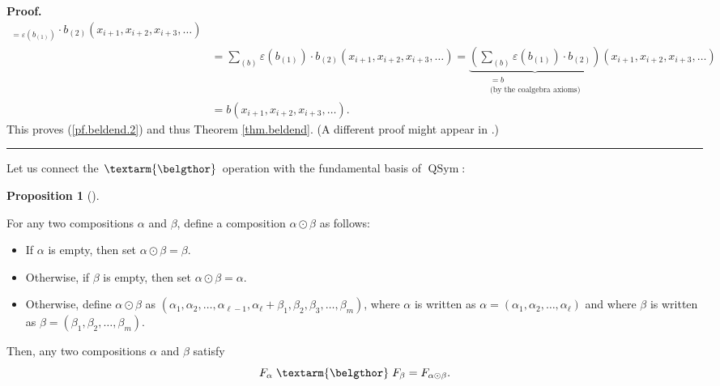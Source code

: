 \documentclass
[numbers=enddot,12pt,final,onecolumn,notitlepage,abstracton]{scrartcl}%
\theoremstyle{definition}
\newtheorem{prop}[theo]{Proposition}
\newenvironment{proposition}[1][]
{\begin{prop}[#1]\begin{leftbar}}
{\end{leftbar}\end{prop}}
\newenvironment{proof}[1][Proof]{\noindent\textbf{#1.} }{\ \rule{0.5em}{0.5em}}
\newenvironment{noncompile}{}{}
\newcommand{\bel}{\left. \textarm{\belgthor} \right.}
\let\sumnonlimits\sum
\renewcommand{\sum}{\sumnonlimits\limits}
\begin{document}
\begin{noncompile}
\begin{proof}
\begin{align*}
{}_{=\varepsilon\left(  b_{\left(  1\right)  }\right)  }\cdot b_{\left(
2\right)  }\left(  x_{i+1},x_{i+2},x_{i+3},\ldots\right) \\
&  =\sum_{\left(  b\right)  }\varepsilon\left(  b_{\left(  1\right)  }\right)
\cdot b_{\left(  2\right)  }\left(  x_{i+1},x_{i+2},x_{i+3},\ldots\right)
=\underbrace{\left(  \sum_{\left(  b\right)  }\varepsilon\left(  b_{\left(
1\right)  }\right)  \cdot b_{\left(  2\right)  }\right)  }%
_{\substack{=b\\\text{(by the coalgebra axioms)}}}\left(  x_{i+1}%
,x_{i+2},x_{i+3},\ldots\right) \\
&  =b\left(  x_{i+1},x_{i+2},x_{i+3},\ldots\right)  .
\end{align*}
This proves (\ref{pf.beldend.2}) and thus Theorem \ref{thm.beldend}. (A
different proof might appear in \cite{Gri-gammapart}.)
\end{proof}
\end{noncompile}

Let us connect the $\bel $ operation with the fundamental basis of
$\operatorname*{QSym}$:

\begin{proposition}
\label{prop.bel.F}For any two compositions $\alpha$ and $\beta$, define a
composition $\alpha\odot\beta$ as follows:

\begin{itemize}
\item If $\alpha$ is empty, then set $\alpha\odot\beta=\beta$.

\item Otherwise, if $\beta$ is empty, then set $\alpha\odot\beta=\alpha$.

\item Otherwise, define $\alpha\odot\beta$ as $\left(  \alpha_{1},\alpha
_{2},\ldots,\alpha_{\ell-1},\alpha_{\ell}+\beta_{1},\beta_{2},\beta_{3}%
,\ldots,\beta_{m}\right)  $, where $\alpha$ is written as $\alpha=\left(
\alpha_{1},\alpha_{2},\ldots,\alpha_{\ell}\right)  $ and where $\beta$ is
written as $\beta=\left(  \beta_{1},\beta_{2},\ldots,\beta_{m}\right)  $.
\end{itemize}

Then, any two compositions $\alpha$ and $\beta$ satisfy%
\[
F_{\alpha}\bel F_{\beta}=F_{\alpha\odot\beta}.
\]

\end{proposition}
\end{document}
